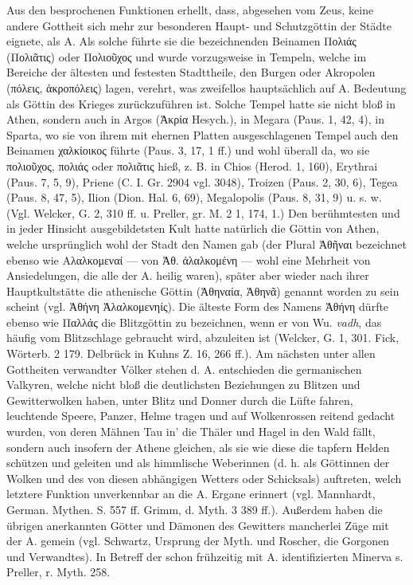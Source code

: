 \documentclass[a4paper, 11pt, oneside]{article}
\begin{document}
Aus den besprochenen Funktionen erhellt, dass, abgesehen vom Zeus, keine andere Gottheit sich mehr zur besonderen Haupt- und Schutzgöttin der Städte eignete, als A. Als solche führte sie die bezeichnenden Beinamen Πολιάς (Πολιᾶτις) oder Πολιοῦχος und wurde vorzugsweise in Tempeln, welche im Bereiche der ältesten und festesten Stadttheile, den Burgen oder Akropolen (πόλεις, ἀκροπόλεις) lagen, verehrt, was zweifellos hauptsächlich auf A. Bedeutung als Göttin des Krieges zurückzuführen ist. Solche Tempel hatte sie nicht bloß in Athen, sondern auch in Argos (Ἀκρία Hesych.), in Megara (Paus. 1, 42, 4), in Sparta, wo sie von ihrem mit ehernen Platten ausgeschlagenen Tempel auch den Beinamen χαλκίοικος führte (Paus. 3, 17, 1 ff.) und wohl überall da, wo sie πολιοῦχος, πολιάς oder πολιᾶτις hieß, z. B. in Chios (Herod. 1, 160), Erythrai (Paus. 7, 5, 9), Priene (C. I. Gr. 2904 vgl. 3048), Troizen (Paus. 2, 30, 6), Tegea (Paus. 8, 47, 5), Ilion (Dion. Hal. 6, 69), Megalopolis (Paus. 8, 31, 9) u. s. w. (Vgl. Welcker, G. 2, 310 ff. u. Preller, gr. M. 2 1, 174, 1.) Den berühmtesten und in jeder Hinsicht ausgebildetsten Kult hatte natürlich die Göttin von Athen, welche ursprünglich wohl der Stadt den Namen gab (der Plural Ἀθῆναι bezeichnet ebenso wie Αλαλκομεναί --- von Ἀθ. ἀλαλκομένη --- wohl eine Mehrheit von Ansiedelungen, die alle der A. heilig waren), später aber wieder nach ihrer Hauptkultstätte die athenische Göttin (Ἀθηναία, Ἀθηνᾶ) genannt worden zu sein scheint (vgl. Ἀθήνη Ἀλαλκομενηίς). Die älteste Form des Namens Ἀθήνη dürfte ebenso wie Παλλάς die Blitzgöttin zu bezeichnen, wenn er von Wu. \emph{vadh}, das häufig vom Blitzschlage gebraucht wird, abzuleiten ist (Welcker, G. 1, 301. Fick, Wörterb. 2 179. Delbrück in Kuhns Z. 16, 266 ff.). Am nächsten unter allen Gottheiten verwandter Völker stehen d. A. entschieden die germanischen Valkyren, welche nicht bloß die deutlichsten Beziehungen zu Blitzen und Gewitterwolken haben, unter Blitz und Donner durch die Lüfte fahren, leuchtende Speere, Panzer, Helme tragen und auf Wolkenrossen reitend gedacht wurden, von deren Mähnen Tau in' die Thäler und Hagel in den Wald fällt, sondern auch insofern der Athene gleichen, als sie wie diese die tapfern Helden schützen und geleiten und als himmlische Weberinnen (d. h. als Göttinnen der Wolken und des von diesen abhängigen Wetters oder Schicksals) auftreten, welch letztere Funktion unverkennbar an die A. Ergane erinnert (vgl. Mannhardt, German. Mythen. S. 557 ff. Grimm, d. Myth. 3 389 ff.). Außerdem haben die übrigen anerkannten Götter und Dämonen des Gewitters mancherlei Züge mit der A. gemein (vgl. Schwartz, Ursprung der Myth. und Roscher, die Gorgonen und Verwandtes). In Betreff der schon frühzeitig mit A. identifizierten Minerva s. Preller, r. Myth. 258.
\end{document}
